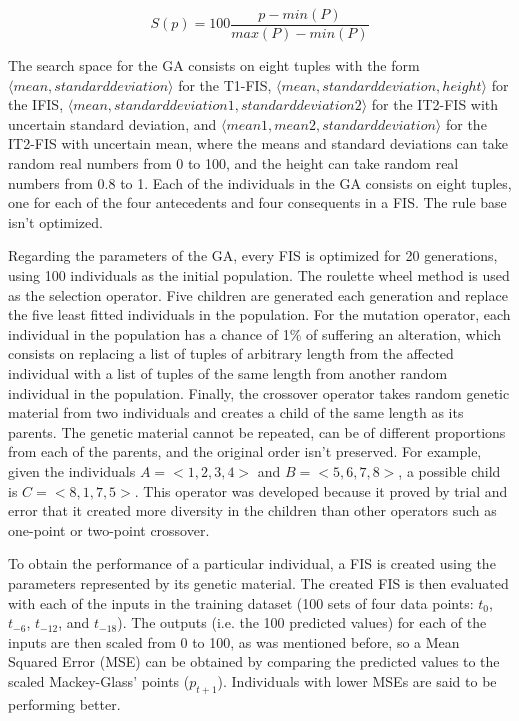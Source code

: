 \documentclass[conference]{IEEEtran}
\begin{document}
\begin{equation}
  \label{scaling}
  S(p) = 100 \frac{p - min(P)}{max(P) - min(P)}
\end{equation}

The search space for the GA consists on eight tuples with the form $\langle
mean, standard deviation \rangle$ for the T1-FIS, $\langle
mean, standard deviation, height \rangle$ for the IFIS, $\langle
mean, standard deviation 1, standard deviation 2 \rangle$ for the
IT2-FIS with uncertain standard deviation, and $\langle
mean 1, mean 2, standard deviation \rangle$ for the IT2-FIS with
uncertain mean, where the means and standard deviations can take
random real numbers from 0 to 100, and the height can take random real
numbers from 0.8 to 1. Each of the individuals in the GA consists on
eight tuples, one for each of the four antecedents and four
consequents in a FIS. The rule base isn't optimized.

Regarding the parameters of the GA, every FIS is optimized for 20
generations, using 100 individuals as the initial population. The
roulette wheel method is used as the selection operator. Five
children are generated each generation and replace the five least
fitted individuals in the population. For the mutation operator, each
individual in the population has a chance of 1\% of suffering an
alteration, which consists on replacing a list of tuples of arbitrary
length from the affected individual with a list of tuples of the same
length from another random individual in the population. Finally, the
crossover operator takes random genetic material from two individuals
and creates a child of the same length as its parents. The genetic
material cannot be repeated, can be of different proportions from each
of the parents, and the original order isn't preserved. For example,
given the individuals $A = <1, 2, 3, 4>$ and $B = <5, 6, 7, 8>$, a
possible child is $C = <8, 1, 7, 5>$. This operator was developed
because it proved by trial and error that it created more diversity in
the children than other operators such as one-point or two-point
crossover.

To obtain the performance of a particular individual, a FIS is created
using the parameters represented by its genetic material. The created
FIS is then evaluated with each of the inputs in the training dataset
(100 sets of four data points: $t_{0}$, $t_{-6}$, $t_{-12}$, and
$t_{-18}$). The outputs (i.e. the 100 predicted values) for each of
the inputs are then scaled from 0 to 100, as was mentioned before, so
a Mean Squared Error (MSE) can be obtained by comparing the predicted values
to the scaled Mackey-Glass' points ($p_{t+1}$). Individuals with lower
MSEs are said to be performing better.
\end{document}
